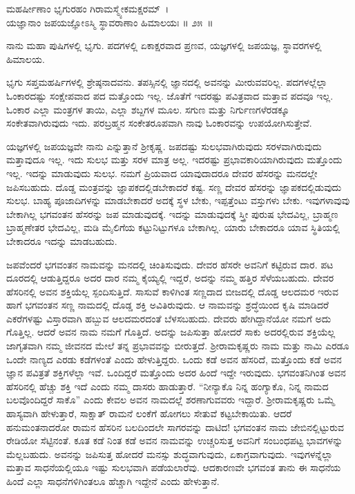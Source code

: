 \begin{shloka}
ಮಹರ್ಷೀಣಾಂ ಭೃಗುರಹಂ ಗಿರಾಮಸ್ಮ್ಯೇಕಮಕ್ಷರಮ್~।\\ಯಜ್ಞಾನಾಂ ಜಪಯಜ್ಞೋಽಸ್ಮಿ ಸ್ಥಾವರಾಣಾಂ ಹಿಮಾಲಯಃ \hfill॥ ೨೫~॥
\end{shloka}

\begin{artha}
ನಾನು ಮಹಾ ಪುಷಿಗಳಲ್ಲಿ ಭೃಗು. ಪದಗಳಲ್ಲಿ ಏಕಾಕ್ಷರವಾದ ಪ್ರಣವ, ಯಜ್ಞಗಳಲ್ಲಿ ಜಪಯಜ್ಞ, ಸ್ಥಾವರಗಳಲ್ಲಿ ಹಿಮಾಲಯ.
\end{artha}

ಭೃಗು ಸಪ್ತಮಹರ್ಷಿಗಳಲ್ಲಿ ಶ್ರೇಷ್ಠನಾದವನು. ತಪಸ್ಸಿನಲ್ಲಿ ಜ್ಞಾನದಲ್ಲಿ ಅವನನ್ನು ಮೀರು\-ವವರಿಲ್ಲ. ಪದಗಳಲ್ಲೆಲ್ಲಾ ಓಂಕಾರದಷ್ಟು ಸಂಕ್ಷೇಪವಾದ ಪದ ಮತ್ತೊಂದು ಇಲ್ಲ. ಜೊತೆಗೆ ಇದರಷ್ಟು ಪವಿತ್ರವಾದ ಮತ್ತಾವ ಪದವೂ ಇಲ್ಲ. ಓಂಕಾರ ಎಲ್ಲಾ ಮಂತ್ರಗಳ ತಾಯಿ, ಎಲ್ಲಾ ಶಬ್ದಗಳ ಮೂಲ. ಸಗುಣ ಮತ್ತು ನಿರ್ಗುಣಗಳೆರಡಕ್ಕೂ ಸಂಕೇತವಾಗಿರುವುದು ಇದು. ಪರಬ್ರಹ್ಮನ ಸಂಕೇತರೂಪವಾಗಿ ನಾವು ಓಂಕಾರವನ್ನು ಉಪಯೋಗಿಸುತ್ತೇವೆ.

ಯಜ್ಞಗಳಲ್ಲಿ ಜಪಯಜ್ಞವೇ ನಾನು ಎನ್ನುತ್ತಾನೆ ಶ‍್ರೀಕೃಷ್ಣ. ಜಪದಷ್ಟು ಸುಲಭವಾಗಿರುವುದು ಸರಳವಾಗಿರುವುದು ಮತ್ತಾವುದೂ ಇಲ್ಲ. ಇದು ಸುಲಭ ಮತ್ತು ಸರಳ ಮಾತ್ರ ಅಲ್ಲ. ಇದರಷ್ಟು ಪ್ರಭಾವಕಾರಿಯಾಗಿರುವುದು ಮತ್ತೊಂದು ಇಲ್ಲ. ಇದನ್ನು ಮಾಡುವುದು ಸುಲಭ. ನಮಗೆ ಪ್ರಿಯವಾದ ಯಾವುದಾದರೂ ದೇವರ ಹೆಸರನ್ನು ಮನದಲ್ಲೇ ಜಪಿಸಬಹುದು. ದೊಡ್ಡ ಮಂತ್ರವನ್ನು ಜ್ಞಾಪಕದಲ್ಲಿಡಬೇಕಾದರೆ ಕಷ್ಟ. ಸಣ್ಣ ದೇವರ ಹೆಸರನ್ನು ಜ್ಞಾಪಕದಲ್ಲಿಡುವುದು ಸುಲಭ. ಬಾಹ್ಯ ಪೂಜಾದಿಗಳನ್ನು ಮಾಡಬೇಕಾದರೆ ಅದಕ್ಕೆ ಸ್ಥಳ ಬೇಕು, ಇಪ್ಪತ್ತೆಂಟು ವಸ್ತುಗಳು ಬೇಕು. ಇವುಗಳಾವುವು ಬೇಕಾಗಿಲ್ಲ ಭಗವಂತನ ಹೆಸರನ್ನು ಜಪ ಮಾಡುವುದಕ್ಕೆ. ಇದನ್ನು ಮಾಡುವುದಕ್ಕೆ ಸ್ತ್ರೀ ಪುರುಷ ಭೇದವಿಲ್ಲ, ಬ್ರಾಹ್ಮಣ ಬ್ರಾಹ್ಮಣೇತರ ಭೇದವಿಲ್ಲ, ಮಡಿ ಮೈಲಿಗೆಯ ಕಟ್ಟುನಿಟ್ಟುಗಳೂ ಬೇಕಾಗಿಲ್ಲ. ಯಾರು ಬೇಕಾದರೂ ಯಾವ ಸ್ಥಿತಿಯಲ್ಲಿ ಬೇಕಾದರೂ ಇದನ್ನು ಮಾಡಬಹುದು.

ಜಪವೆಂದರೆ ಭಗವಂತನ ನಾಮವನ್ನು ಮನದಲ್ಲಿ ಚಿಂತಿಸುವುದು. ದೇವರ ಹೆಸರೇ ಅವನಿಗೆ ಕಟ್ಟಿರುವ ದಾರ. ಪಟ ದೂರದಲ್ಲಿ ಆಡುತ್ತಿದ್ದರೂ ಅದರ ದಾರ ನಮ್ಮ ಕೈಯ್ಯಲ್ಲಿ ಇದ್ದರೆ, ಅದನ್ನು ನಮ್ಮ ಹತ್ತಿರ ಸೆಳೆಯಬಹುದು. ದೇವರ ಹೆಸರಿನಲ್ಲಿ ಅವನ ಶಕ್ತಿಯೆಲ್ಲ ಸ್ಪಂದಿಸುತ್ತಿದೆ. ಸಾಸುವೆ ಕಾಳಿಗಿಂತ ಸಣ್ಣದಾದ ಬೀಜದಲ್ಲಿ ದೊಡ್ಡ ಆಲದಮರ ಇರುವ ಹಾಗೆ ಭಗವಂತನ ಸಣ್ಣ ನಾಮದಲ್ಲಿ ದೊಡ್ಡ ಶಕ್ತಿ ಅವಿತಿರುವುದು. ಆ ನಾಮವನ್ನು ಶ್ರದ್ಧೆಯಿಂದ ಕೃಷಿ ಮಾಡಿದರೆ ಎಕರೆಗಳಷ್ಟು ವಿಸ್ತಾರವಾಗಿ ಹಬ್ಬುವ ಆಲದಮರದಂತೆ ಬೆಳಸಬಹುದು. ದೇವರು ಹೇಗಿದ್ದಾನೆಯೋ ನಮಗೆ ಅದು ಗೊತ್ತಿಲ್ಲ. ಆದರೆ ಅವನ ನಾಮ ನಮಗೆ ಗೊತ್ತಿದೆ. ಅದನ್ನು ಜಪಿಸುತ್ತಾ ಹೋದರೆ ಸಾಕು ಅದರಲ್ಲಿರುವ ಶಕ್ತಿಯೆಲ್ಲ ಜಾಗೃತವಾಗಿ ನಮ್ಮ ಜೀವನದ ಮೇಲೆ ತನ್ನ ಪ್ರಭಾವವನ್ನು ಬೀರುತ್ತದೆ. ಶ‍್ರೀರಾಮಕೃಷ್ಣರು ನಾಮ ಮತ್ತು ನಾಮಿ ಎರಡೂ ಒಂದೇ ನಾಣ್ಯದ ಎರಡು ಕಡೆಗಳಂತೆ ಎಂದು ಹೇಳುತ್ತಿದ್ದರು. ಒಂದು ಕಡೆ ಅವನ ಹೆಸರಿದೆ, ಮತ್ತೊಂದು ಕಡೆ ಅವನ ಜ್ಞಾನ ಪವಿತ್ರತೆ ಶಕ್ತಿಗಳೆಲ್ಲಾ ಇವೆ. ಒಂದಿದ್ದರೆ ಮತ್ತೊಂದು ಅದರ ಹಿಂದೆ ಇದ್ದೇ ಇರುವುದು. ಭಗವಂತನಿಗಿಂತ ಅವನ ಹೆಸರಿನಲ್ಲಿ ಹೆಚ್ಚು ಶಕ್ತಿ ಇದೆ ಎಂದು ನಮ್ಮ ದಾಸರು ಹಾಡುತ್ತಾರೆ. “ನೀನ್ಯಾಕೊ ನಿನ್ನ ಹಂಗ್ಯಾಕೊ, ನಿನ್ನ ನಾಮದ ಬಲವೊಂದಿದ್ದರೆ ಸಾಕೊ” ಎಂದು ಕೇವಲ ಅವನ ನಾಮದಲ್ಲೆ ಶರಣಾಗುವವರು ಇದ್ದಾರೆ. ಶ‍್ರೀರಾಮಕೃಷ್ಣರು ಒಮ್ಮೆ ಹಾಸ್ಯವಾಗಿ ಹೇಳುತ್ತಾರೆ, ಸಾಕ್ಷಾತ್ ರಾಮನೆ ಲಂಕೆಗೆ ಹೋಗಲು ಸೇತುವೆ ಕಟ್ಟಬೇಕಾಯಿತು. ಆದರೆ ಹನುಮಂತನಾದರೋ ರಾಮನ ಹೆಸರಿನ ಬಲದಿಂದಲೇ ಸಾಗರವನ್ನು ದಾಟಿದ! ಭಗವಂತನ ನಾಮ ಜೇಬಿನಲ್ಲಿಟ್ಟುರುವ ರೇಡಿಯೋ ಸೆಟ್ಟಿನಂತೆ. ಕೂತ ಕಡೆ ನಿಂತ ಕಡೆ ಅವನ ನಾಮವನ್ನು ಉಚ್ಚರಿಸುತ್ತ ಅವನಿಗೆ ಸಂಬಂಧಪಟ್ಟ ಭಾವಗಳನ್ನು ಮೆಲ್ಲಬಹುದು. ಅವನನ್ನು ಜಪಿಸುತ್ತ ಹೋದರೆ ಮನಸ್ಸು ಶುದ್ಧವಾಗುವುದು, ಏಕಾಗ್ರವಾಗುವುದು. ಇವುಗಳನ್ನೆಲ್ಲಾ ಮತ್ತಾವ ಸಾಧನೆಯಲ್ಲಿಯೂ ಇಷ್ಟು ಸುಲಭವಾಗಿ ಪಡೆಯಲಾರೆವು. ಆದಕಾರಣವೇ ಭಗವಂತ ತಾನು ಈ ಸಾಧನೆಯ ಹಿಂದೆ ಎಲ್ಲಾ ಸಾಧನೆಗಳಿಗಿಂತಲೂ ಹೆಚ್ಚಾಗಿ ಇದ್ದೇನೆ ಎಂದು ಹೇಳುತ್ತಾನೆ.

